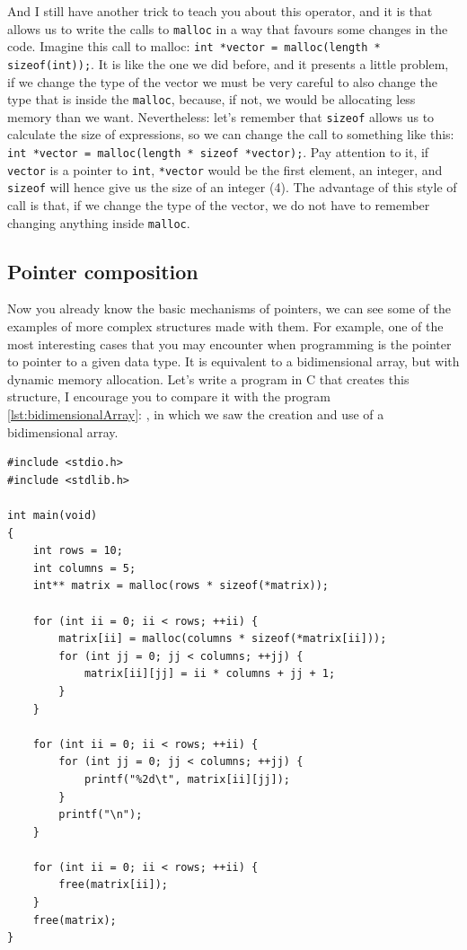 \documentclass[a4paper]{article}
\begin{document}
And I still have another trick to teach you about this operator, and it is
that allows us to write the calls to \texttt{malloc} in a way that favours some
changes in the code. Imagine this call to malloc:
\lstinline[style=C]{int *vector = malloc(length * sizeof(int));}.
It is like the one we did before, and it presents a little problem, if we change
the type of the vector we must be very careful to also change the type that
is inside the \texttt{malloc}, because, if not, we would be allocating less
memory than we want. Nevertheless: let's remember that \verb!sizeof! allows us
to calculate the size of expressions, so we can change the call to something
like this: \lstinline[style=C]{int *vector = malloc(length * sizeof *vector);}.
Pay attention to it, if \verb!vector! is a pointer to \verb!int!, \verb!*vector!
would be the first element, an integer, and \verb!sizeof! will hence give us
the size of an integer (4). The advantage of this style of call is that, if we
change the type of the vector, we do not have to remember changing anything
inside \verb!malloc!.

\subsection{Pointer composition}
Now you already know the basic mechanisms of pointers, we can see some of the
examples of more complex structures made with them. For example, one of the most
interesting cases that you may encounter when programming is the pointer to
pointer to a given data type. It is equivalent to a bidimensional array, but
with dynamic memory allocation. Let's write a program in C that creates this
structure, I encourage you to compare it with the program
\ref{lst:bidimensionalArray}: , in which we
saw the creation and use of a bidimensional array.

\noindent
\begin{minipage}[H]{\linewidth}
\mbox{}
\begin{lstlisting}[style=C,
caption={Reserva, uso y liberación de un vector de vectores},
label={lst:bidimensionalVector}]
#include <stdio.h>
#include <stdlib.h>

int main(void)
{
    int rows = 10;
    int columns = 5;
    int** matrix = malloc(rows * sizeof(*matrix));

    for (int ii = 0; ii < rows; ++ii) {
        matrix[ii] = malloc(columns * sizeof(*matrix[ii]));
        for (int jj = 0; jj < columns; ++jj) {
            matrix[ii][jj] = ii * columns + jj + 1;
        }
    }

    for (int ii = 0; ii < rows; ++ii) {
        for (int jj = 0; jj < columns; ++jj) {
            printf("%2d\t", matrix[ii][jj]);
        }
        printf("\n");
    }

    for (int ii = 0; ii < rows; ++ii) {
        free(matrix[ii]);
    }
    free(matrix);
}
\end{lstlisting}
\end{minipage}
\end{document}
